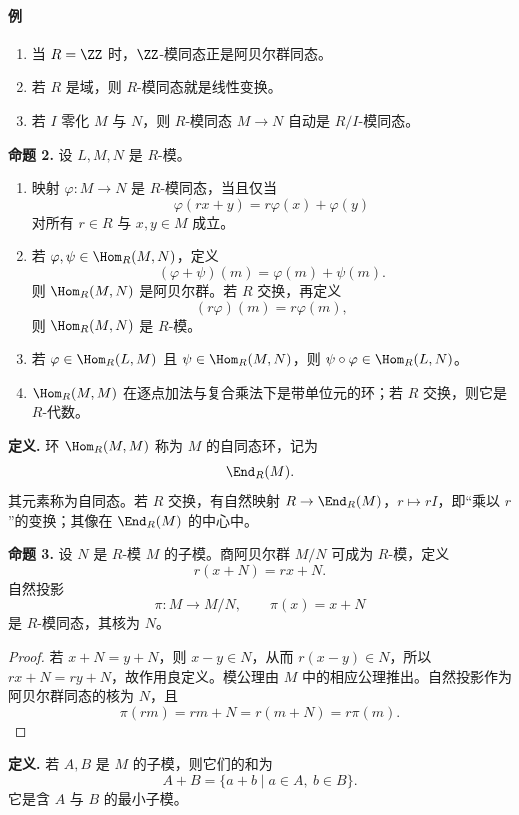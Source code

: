 \paragraph{例}
\begin{enumerate}[label=(\arabic*)]
	\item 当 $R=\ZZ$ 时，$\ZZ$-模同态正是阿贝尔群同态。
	\item 若 $R$ 是域，则 $R$-模同态就是线性变换。
	\item 若 $I$ 零化 $M$ 与 $N$，则 $R$-模同态 $M\to N$ 自动是 $R/I$-模同态。
\end{enumerate}


\noindent\textbf{命题 2.} 设 $L,M,N$ 是 $R$-模。
\begin{enumerate}[label=(\arabic*)]
	\item 映射 $\varphi:M\to N$ 是 $R$-模同态，当且仅当
	\[
	\varphi(rx+y)=r\varphi(x)+\varphi(y)
	\]
	对所有 $r\in R$ 与 $x,y\in M$ 成立。
	\item 若 $\varphi,\psi\in\Hom_R(M,N)$，定义
	\[
	(\varphi+\psi)(m)=\varphi(m)+\psi(m).
	\]
	则 $\Hom_R(M,N)$ 是阿贝尔群。若 $R$ 交换，再定义
	\[
	(r\varphi)(m)=r\varphi(m),
	\]
	则 $\Hom_R(M,N)$ 是 $R$-模。
	\item 若 $\varphi\in\Hom_R(L,M)$ 且 $\psi\in\Hom_R(M,N)$，则 $\psi\circ\varphi\in\Hom_R(L,N)$。
	\item $\Hom_R(M,M)$ 在逐点加法与复合乘法下是带单位元的环；若 $R$ 交换，则它是 $R$-代数。
\end{enumerate}


\noindent\textbf{定义.} 环 $\Hom_R(M,M)$ 称为 $M$ 的自同态环，记为
\[
\End_R(M).
\]
其元素称为自同态。若 $R$ 交换，有自然映射 $R\to\End_R(M)$，$r\mapsto rI$，即“乘以 $r$”的变换；其像在 $\End_R(M)$ 的中心中。


\noindent\textbf{命题 3.} 设 $N$ 是 $R$-模 $M$ 的子模。商阿贝尔群 $M/N$ 可成为 $R$-模，定义
\[
r(x+N)=rx+N.
\]
自然投影
\[
\pi:M\longrightarrow M/N,
\qquad \pi(x)=x+N
\]
是 $R$-模同态，其核为 $N$。

\begin{proof}
	若 $x+N=y+N$，则 $x-y\in N$，从而 $r(x-y)\in N$，所以 $rx+N=ry+N$，故作用良定义。模公理由 $M$ 中的相应公理推出。自然投影作为阿贝尔群同态的核为 $N$，且
	\[
	\pi(rm)=rm+N=r(m+N)=r\pi(m).
	\]
\end{proof}


\noindent\textbf{定义.} 若 $A,B$ 是 $M$ 的子模，则它们的和为
\[
A+B=\{a+b\mid a\in A,\ b\in B\}.
\]
它是含 $A$ 与 $B$ 的最小子模。


